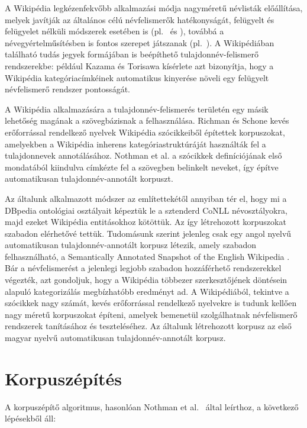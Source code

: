 \documentclass{llncs}
\begin{document}
A Wikipédia legkézenfekvőbb alkalmazási módja nagyméretű névlisták előállítása, melyek javítják az általános célú névfelismerők hatékonyságát, felügyelt és felügyelet nélküli módszerek esetében is (pl.~\cite{Toral:06} és \cite{Nadeau:06}), továbbá a névegyértelműsítésben is fontos szerepet játszanak (pl.~\cite{Bunescu:06}). A Wikipédiában található tudás jegyek formájában is beépíthető tulajdonnév-felismerő rendszerekbe: például Kazama és Torisawa \cite{KaTo07} kísérlete azt bizonyítja, hogy a Wikipédia kategóriacímkéinek automatikus kinyerése növeli egy felügyelt névfelismerő rendszer pontosságát. 

A Wikipédia alkalmazására a tulajdonnév-felismerés területén egy másik lehetőség magának a szövegbázisnak a felhasználása. Richman és Schone \cite{Richman:08} kevés erőforrással rendelkező nyelvek Wikipédia szócikkeiből építettek korpuszokat, amelyekben a Wikipédia inherens kategóriastruktúráját használták fel a tulajdonnevek annotálásához. Nothman et al. \cite{Nothman:08} a szócikkek definíciójának első mondatából kiindulva címkézte fel a szövegben belinkelt neveket, így építve automatikusan tulajdonnév-annotált korpuszt. 

Az általunk alkalmazott módszer az említettekétől annyiban tér el, hogy mi a DBpedia ontológiai osztályait képeztük le a sztenderd CoNLL névosztályokra, majd ezeket Wikipédia entitásokhoz kötöttük. Az így létrehozott korpuszokat szabadon elérhetővé tettük. Tudomásunk szerint jelenleg csak egy angol nyelvű automatikusan tulajdonnév-annotált korpusz létezik, amely szabadon felhasználható, a Semantically Annotated Snapshot of the English Wikipedia \cite{Atserias:08}. Bár a névfelismerést a jelenlegi legjobb szabadon hozzáférhető rendszerekkel végezték, azt gondoljuk, hogy a Wikipédia többezer szerkesztőjének döntésein alapuló kategorizálás megbízhatóbb eredményt ad. A Wikipédiából, tekintve a szócikkek nagy számát, kevés erőforrással rendelkező nyelvekre is tudunk kellően nagy méretű korpuszokat építeni, amelyek bemenetül szolgálhatnak névfelismerő rendszerek tanításához és teszteléséhez. Az általunk létrehozott korpusz az első magyar nyelvű automatikusan tulajdonnév-annotált korpusz. 

\section{Korpuszépítés}
\label{corpusbuilding}

A korpuszépítő algoritmus, hasonlóan Nothman et al.~\cite{Nothman:08} által
leírthoz, a következő lépésekből áll:
\end{document}
